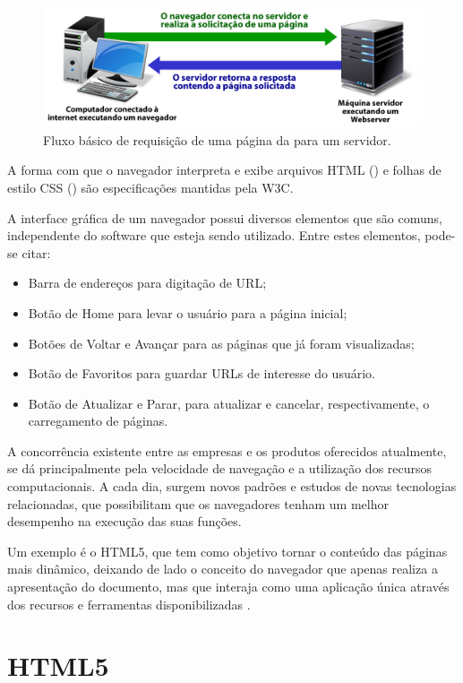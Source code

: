 \documentclass[espaco=simples,appendix=Name]{abnt}
\begin{document}
\begin{figure}[h]
  \centering
    \includegraphics[scale=0.4]{web_basic.png}
  \caption{Fluxo básico de requisição de uma página da  para um servidor.}
\end{figure}
 
A forma com que o navegador interpreta e exibe arquivos HTML () e folhas de estilo CSS () são especificações mantidas pela W3C.

A interface gráfica de um navegador possui diversos elementos que são comuns, independente do software que esteja sendo utilizado. Entre estes elementos, pode-se citar: 
\begin{itemize}
	\item Barra de endereços para digitação de URL;
	\item Botão de Home para levar o usuário para a página inicial;
	\item Botões de Voltar e Avançar para as páginas que já foram visualizadas;
	\item Botão de Favoritos para guardar URLs de interesse do usuário.
	\item Botão de Atualizar e Parar, para atualizar e cancelar, respectivamente, o carregamento de páginas.
\end{itemize}

A concorrência existente entre as empresas e os produtos oferecidos atualmente, se dá principalmente pela velocidade de navegação e a utilização dos recursos computacionais. A cada dia, surgem novos padrões e estudos de novas tecnologias relacionadas, que possibilitam que os navegadores tenham um melhor desempenho na execução das suas funções. 

Um exemplo é o HTML5, que tem como objetivo tornar o conteúdo das páginas mais dinâmico, deixando de lado o conceito do navegador que apenas realiza a apresentação do documento, mas que interaja como uma aplicação única através dos recursos e ferramentas disponibilizadas \cite{WebAppPlataform}.

\section{HTML5}
\end{document}

